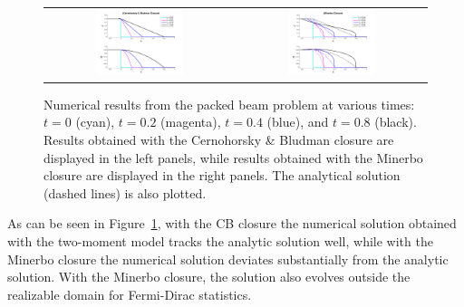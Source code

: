 \begin{figure}[h]
  \centering
  \begin{tabular}{cc}
    \includegraphics[width=0.485\textwidth]{figures/PackedBeam_ME_CB} &
    \includegraphics[width=0.485\textwidth]{figures/PackedBeam_ME_MI}
  \end{tabular}
   \caption{Numerical results from the packed beam problem at various times: $t=0$ (cyan), $t=0.2$ (magenta), $t=0.4$ (blue), and $t=0.8$ (black).  Results obtained with the Cernohorsky \& Bludman closure are displayed in the left panels, while results obtained with the Minerbo closure are displayed in the right panels.  The analytical solution (dashed lines) is also plotted.}
  \label{fig:PackedBeam}
\end{figure}

As can be seen in Figure~\ref{fig:PackedBeam}, with the CB closure the numerical solution obtained with the two-moment model tracks the analytic solution well, while with the Minerbo closure the numerical solution deviates substantially from the analytic solution.  
With the Minerbo closure, the solution also evolves outside the realizable domain for Fermi-Dirac statistics.  

